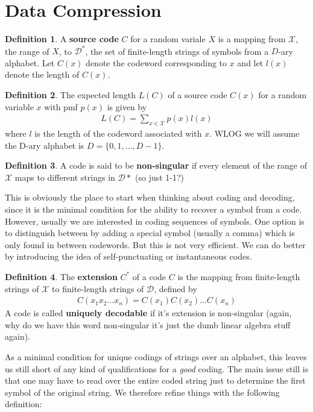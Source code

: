 \documentclass{article}
\theoremstyle{definition}
\newtheorem{definition}{Definition}[section]
\theoremstyle{plain}
\begin{document}
\section{Data Compression}
\begin{definition}
	A \textbf{source code} $C$ for a random variale $X$ is a mapping from $\mathcal{X}$, the range of $X$, to $\mathcal{D}^*$, the set of finite-length strings of symbols from a $D$-ary alphabet. Let $C(x)$ denote the codeword corresponding to $x$ and let $l(x)$ denote the length of $C(x)$. 
\end{definition}
\begin{definition}
	The expected length $L(C)$ of a source code $C(x)$ for a random variable $x$ with pmf $p(x)$ is given by 
	\begin{align}
		L(C) = \sum_{x \in \mathcal{X}} p(x)l(x)
	\end{align}
where $l$ is the length of the codeword associated with $x$. WLOG we will assume the D-ary alphabet is $D = \{0,1,\ldots,D-1\}$. 
\end{definition}
\begin{definition}
	A code is said to be \textbf{non-singular} if every element of the range of $\mathcal{X}$ maps to different strings in $\mathcal{D}*$ (so just 1-1?)
\end{definition}
This is obviously the place to start when thinking about coding and decoding, since it is the minimal condition for the ability to recover a symbol from a code. However, usually we are interested in coding sequences of symbols. One option is to distinguish between by adding a special symbol (usually a comma) which is only found in between codewords. But this is not very efficient. We can do better by introducing the idea of self-punctuating or instantaneous codes. 
\begin{definition}
	The \textbf{extension} $C^*$ of a code $C$ is the mapping from finite-length strings of $\mathcal{X}$ to finite-length strings of $\mathcal{D}$, defined by 
	\begin{align}
		C(x_1x_2\ldots x_n) = C(x_1)C(x_2)\ldots C(x_n)
	\end{align}
A code is called \textbf{uniquely decodable} if it's extension is non-singular (again, why do we have this word non-singular it's just the dumb linear algebra stuff again). 
\end{definition}
As a minimal condition for unique codings of strings over an alphabet, this leaves us still short of any kind of qualifications for a \emph{good} coding. The main issue still is that one may have to read over the entire coded string just to determine the first symbol of the original string. We therefore refine things with the following definition:
\end{document}
